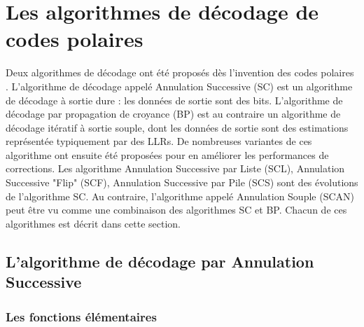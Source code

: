 \section{Les algorithmes de décodage de codes polaires}

Deux algorithmes de décodage ont été proposés dès l'invention des codes polaires \cite{arikan_channel_2009}. L'algorithme de décodage appelé Annulation Successive (SC) est un algorithme de décodage à sortie dure : les données de sortie sont des bits. L'algorithme de décodage par propagation de croyance (BP) est au contraire un algorithme de décodage itératif à sortie souple, dont les données de sortie sont des estimations représentée typiquement par des LLRs. De nombreuses variantes de ces algorithme ont ensuite été proposées pour en améliorer les performances de corrections. Les algorithme Annulation Successive par Liste (SCL), Annulation Successive "Flip" (SCF), Annulation Successive par Pile (SCS) sont des évolutions de l'algorithme SC. Au contraire, l'algorithme appelé Annulation Souple (SCAN) peut être vu comme une combinaison des algorithmes SC et BP. Chacun de ces algorithmes est décrit dans cette section.

\subsection{L'algorithme de décodage par Annulation Successive}

\subsubsection{Les fonctions élémentaires}


